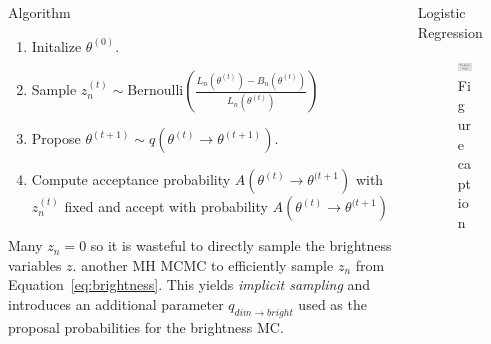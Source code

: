 \documentclass[final]{beamer}
\newlength{\onecolwid}
\newlength{\twocolwid}
\begin{document}
\begin{frame}[t]
\begin{columns}[t]
\begin{column}{\twocolwid}
\begin{columns}[t,totalwidth=\twocolwid]
\begin{column}{\onecolwid}
\begin{block}{Algorithm}
\begin{enumerate}
  \item Initalize $\theta^{(0)}$.
  \item Sample $z^{(t)}_n \sim \text{Bernoulli}\left(
    \frac{L_n(\theta^{(t)}) - B_n(\theta^{(t)})}{L_n(\theta^{(t)})}
    \right)$
  \item Propose $\theta^{(t+1)} \sim q(\theta^{(t)} \to \theta^{(t+1)})$.
  \item Compute acceptance probability $A(\theta^{(t)} \to \theta^{(t+1})$
    with $z^{(t)}_n$ fixed and accept with probability $A(\theta^{(t)} \to \theta^{(t+1})$
\end{enumerate}

Many $z_n = 0$ so it is wasteful to directly sample the brightness variables
$z$. another MH MCMC to efficiently sample $z_n$ from
Equation~\ref{eq:brightness}. This yields \emph{implicit sampling} and
introduces an additional parameter $q_{dim \to bright}$ used as the proposal
probabilities for the brightness MC.

\end{block}

\end{column} %

\begin{column}{\onecolwid}\vspace{-.6in} %

\begin{block}{Logistic Regression}

\begin{figure}
\includegraphics[width=0.8\linewidth]{placeholder.jpg}
\caption{Figure caption}
\end{figure}


\end{block}
\end{column}
\end{columns}
\end{column}
\end{columns}
\end{frame}
\end{document}
